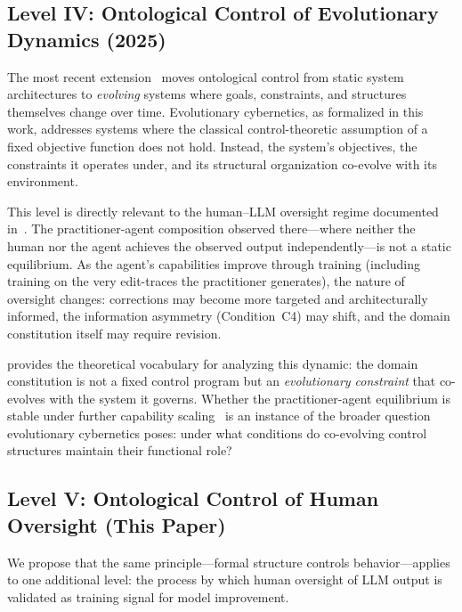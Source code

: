 \documentclass[11pt]{article}
\begin{document}
\subsection{Level IV: Ontological Control of Evolutionary Dynamics (2025)}
\label{sec:level4}

The most recent extension~\citep{palagin2025evolutionary} moves ontological control from static system architectures to \emph{evolving} systems where goals, constraints, and structures themselves change over time.
Evolutionary cybernetics, as formalized in this work, addresses systems where the classical control-theoretic assumption of a fixed objective function does not hold.
Instead, the system's objectives, the constraints it operates under, and its structural organization co-evolve with its environment.

This level is directly relevant to the human--LLM oversight regime documented in~\citet{ovcharov2026edittrace}.
The practitioner-agent composition observed there---where neither the human nor the agent achieves the observed output independently---is not a static equilibrium.
As the agent's capabilities improve through training (including training on the very edit-traces the practitioner generates), the nature of oversight changes: corrections may become more targeted and architecturally informed, the information asymmetry (Condition~C4) may shift, and the domain constitution itself may require revision.

\citet{palagin2025evolutionary} provides the theoretical vocabulary for analyzing this dynamic: the domain constitution is not a fixed control program but an \emph{evolutionary constraint} that co-evolves with the system it governs.
Whether the practitioner-agent equilibrium is stable under further capability scaling~\citep{burns2023weak} is an instance of the broader question evolutionary cybernetics poses: under what conditions do co-evolving control structures maintain their functional role?

\subsection{Level V: Ontological Control of Human Oversight (This Paper)}
\label{sec:level5}

We propose that the same principle---formal structure controls behavior---applies to one additional level: the process by which human oversight of LLM output is validated as training signal for model improvement.
\end{document}
